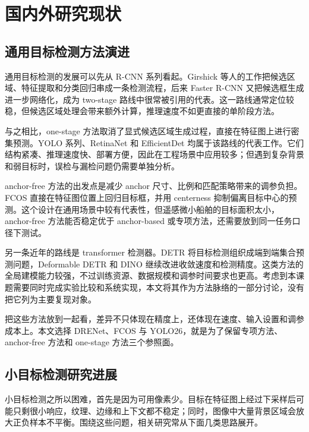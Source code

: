 \section{国内外研究现状}\label{sec:related_work}

\subsection{通用目标检测方法演进}

通用目标检测的发展可以先从 R-CNN 系列看起。Girshick 等人的工作\cite{girshick2014_rcnn}把候选区域、特征提取和分类回归串成一条检测流程，后来 Faster R-CNN\cite{ren2015_fasterrcnn} 又把候选框生成进一步网络化，成为 two-stage 路线中很常被引用的代表。这一路线通常定位较稳，但候选区域处理会带来额外计算，推理速度不如更直接的单阶段方法。

与之相比，one-stage 方法取消了显式候选区域生成过程，直接在特征图上进行密集预测。YOLO 系列\cite{redmon2016_yolo,redmon2018_yolov3}、RetinaNet\cite{lin2017_focalloss} 和 EfficientDet\cite{tan2020_efficientdet} 均属于该路线的代表工作。它们结构紧凑、推理速度快、部署方便，因此在工程场景中应用较多；但遇到复杂背景和弱目标时，误检与漏检问题仍需要单独分析。

anchor-free 方法的出发点是减少 anchor 尺寸、比例和匹配策略带来的调参负担。FCOS\cite{tian2019_fcos} 直接在特征图位置上回归目标框，并用 centerness 抑制偏离目标中心的预测。这个设计在通用场景中较有代表性，但遥感微小船舶的目标面积太小，anchor-free 方法能否稳定优于 anchor-based 或专项方法，还需要放到同一任务口径下测试。

另一条近年的路线是 transformer 检测器。DETR\cite{carion2020_detr} 将目标检测组织成端到端集合预测问题，Deformable DETR\cite{zhu2021_deformabledetr} 和 DINO\cite{zhang2023_dino} 继续改进收敛速度和检测精度。这类方法的全局建模能力较强，不过训练资源、数据规模和调参时间要求也更高。考虑到本课题需要同时完成实验比较和系统实现，本文将其作为方法脉络的一部分讨论，没有把它列为主要复现对象。

把这些方法放到一起看，差异不只体现在精度上，还体现在速度、输入设置和调参成本上。本文选择 DRENet、FCOS 与 YOLO26，就是为了保留专项方法、anchor-free 方法和 one-stage 方法三个参照面。

\subsection{小目标检测研究进展}

小目标检测之所以困难，首先是因为可用像素少。目标在特征图上经过下采样后可能只剩很小响应，纹理、边缘和上下文都不稳定；同时，图像中大量背景区域会放大正负样本不平衡。围绕这些问题，相关研究常从下面几类思路展开。

